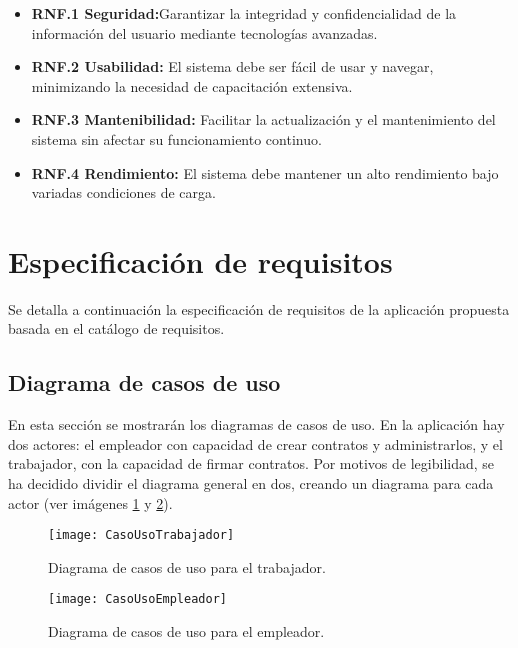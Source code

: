 \begin{itemize}

\item \textbf{RNF.1 Seguridad:}Garantizar la integridad y confidencialidad de la información del usuario mediante tecnologías avanzadas.

\item \textbf{RNF.2 Usabilidad:} El sistema debe ser fácil de usar y navegar, minimizando la necesidad de capacitación extensiva.

\item \textbf{RNF.3 Mantenibilidad:} Facilitar la actualización y el mantenimiento del sistema sin afectar su funcionamiento continuo.

\item \textbf{RNF.4 Rendimiento:} El sistema debe mantener un alto rendimiento bajo variadas condiciones de carga.

\end{itemize}


\section{Especificación de requisitos}

Se detalla a continuación la especificación de requisitos de la aplicación propuesta basada en el catálogo de requisitos.

\subsection{Diagrama de casos de uso}

En esta sección se mostrarán los diagramas de casos de uso. En la aplicación hay dos actores: el empleador con capacidad de crear contratos y administrarlos, y el trabajador, con la capacidad de firmar contratos.
Por motivos de legibilidad, se ha decidido dividir el diagrama general en dos, creando un diagrama para cada actor (ver imágenes \ref{img:CasoUsoTrabajador} y \ref{img:CasoUsoEmpleador}). 


\begin{figure}[h]
	\label{img:CasoUsoTrabajador}
	\centering
	\texttt{[image: CasoUsoTrabajador]}
	\caption[Diagrama de casos de uso trabajador]{Diagrama de casos de uso para el trabajador.}
\end{figure}


\begin{figure}[h]
	\label{img:CasoUsoEmpleador}
	\centering
	\texttt{[image: CasoUsoEmpleador]}
	\caption[Diagrama de casos de uso empleador]{Diagrama de casos de uso para el empleador.}
\end{figure}




